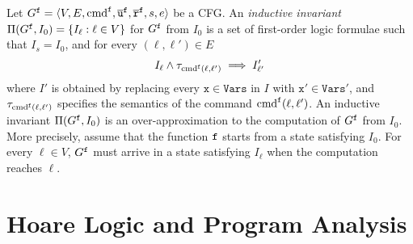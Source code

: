 
Let $G^{\mathtt{{f}}} = \langle V, E ,\textup{\textmd{{cmd}}}^{\mathtt{{f}}},
\overline{\mathtt{u}}^{\mathtt{{f}}}, \overline{\mathtt{r}}^{\mathtt{{f}}},  s,
e \rangle$ be a CFG.
An \emph{inductive invariant} $\Pi (G^{\mathtt{{f}}},I_0) = \{ I_\ell : \ell \in V \}$
for $G^{\mathtt{{f}}}$ from $I_0$ is a set of first-order logic formulae such that
$I_s = I_0$, and for every $(\ell, \ell') \in E$
\begin{equation*}
I_{\ell} \wedge \tau_{\textup{\textmd{{cmd}}}^{\mathtt{{f}}}(\ell, \ell')} \implies I'_{\ell'}
\end{equation*}
where $I'$ is obtained by replacing every $\mathtt{x} \in \mathtt{Vars}$ in $I$
with $\mathtt{x}' \in \mathtt{Vars}'$,
and $\tau_{\textup{\textmd{{cmd}}}^{\mathtt{{f}}} (\ell, \ell')}$ specifies the semantics of the
command $\textup{\textmd{{cmd}}}^{\mathtt{{f}}} (\ell, \ell')$.
An inductive invariant $\Pi (G^{\mathtt{{f}}}, I_0)$ is an over-approximation to the
computation of $G^{\mathtt{{f}}}$ from $I_0$.
More precisely, assume that the function ${\mathtt{{f}}}$ starts from a state
satisfying $I_0$.
For every $\ell\in V$, $G^{\mathtt{{f}}}$ must arrive in a state satisfying
$I_{\ell}$ when the computation reaches $\ell$.


\section{Hoare Logic and Program Analysis}\label{sec:analysis}

